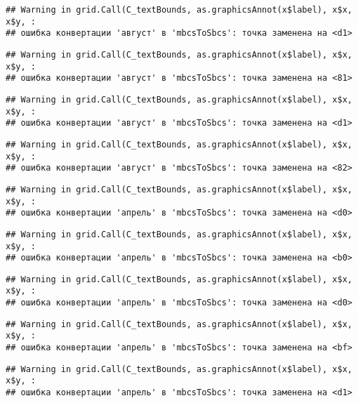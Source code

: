 \documentclass[
]{article}
\begin{document}
\begin{verbatim}
## Warning in grid.Call(C_textBounds, as.graphicsAnnot(x$label), x$x, x$y, :
## ошибка конвертации 'август' в 'mbcsToSbcs': точка заменена на <d1>
\end{verbatim}

\begin{verbatim}
## Warning in grid.Call(C_textBounds, as.graphicsAnnot(x$label), x$x, x$y, :
## ошибка конвертации 'август' в 'mbcsToSbcs': точка заменена на <81>
\end{verbatim}

\begin{verbatim}
## Warning in grid.Call(C_textBounds, as.graphicsAnnot(x$label), x$x, x$y, :
## ошибка конвертации 'август' в 'mbcsToSbcs': точка заменена на <d1>
\end{verbatim}

\begin{verbatim}
## Warning in grid.Call(C_textBounds, as.graphicsAnnot(x$label), x$x, x$y, :
## ошибка конвертации 'август' в 'mbcsToSbcs': точка заменена на <82>
\end{verbatim}

\begin{verbatim}
## Warning in grid.Call(C_textBounds, as.graphicsAnnot(x$label), x$x, x$y, :
## ошибка конвертации 'апрель' в 'mbcsToSbcs': точка заменена на <d0>
\end{verbatim}

\begin{verbatim}
## Warning in grid.Call(C_textBounds, as.graphicsAnnot(x$label), x$x, x$y, :
## ошибка конвертации 'апрель' в 'mbcsToSbcs': точка заменена на <b0>
\end{verbatim}

\begin{verbatim}
## Warning in grid.Call(C_textBounds, as.graphicsAnnot(x$label), x$x, x$y, :
## ошибка конвертации 'апрель' в 'mbcsToSbcs': точка заменена на <d0>
\end{verbatim}

\begin{verbatim}
## Warning in grid.Call(C_textBounds, as.graphicsAnnot(x$label), x$x, x$y, :
## ошибка конвертации 'апрель' в 'mbcsToSbcs': точка заменена на <bf>
\end{verbatim}

\begin{verbatim}
## Warning in grid.Call(C_textBounds, as.graphicsAnnot(x$label), x$x, x$y, :
## ошибка конвертации 'апрель' в 'mbcsToSbcs': точка заменена на <d1>
\end{verbatim}
\end{document}
